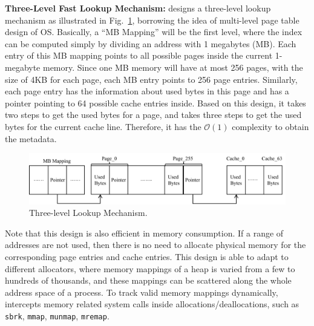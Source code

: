 
\textbf{Three-Level Fast Lookup Mechanism:} \MP{} designs a three-level lookup mechanism as illustrated in Fig.~\ref{fig:lookup}, borrowing the idea of multi-level page table design of OS. Basically, a ``MB Mapping'' will be the first level, where the index can be computed simply by dividing an address with 1 megabytes (MB). Each entry of this MB mapping points to all possible pages inside the current 1-megabyte memory. Since one MB memory will have at most 256 pages, with the size of 4KB for each page, each MB entry points to 256 page entries. Similarly, each page entry has the information about used bytes in this page and has a pointer pointing to 64 possible cache entries inside. Based on this design, it takes two steps to get the used bytes for a page, and takes three steps to get the used bytes for the current cache line. Therefore, it has the $\mathcal{O}(1)$ 
complexity to obtain the metadata.  
          
\begin{figure}[!h]
\centering
\includegraphics[width=5.5in]{figures/lookup}
\caption{Three-level Lookup Mechanism.\label{fig:lookup}}
\end{figure}

Note that this design is also efficient in memory consumption. If a range of addresses are not used, then there is no need to allocate physical memory for the corresponding page entries and cache entries. This design is able to adapt to different allocators, where memory mappings of a heap is varied from a few to hundreds of thousands, and these mappings can be scattered along the whole address space of a process. To track valid memory mappings dynamically, \MP{} intercepts memory related system calls inside allocations/deallocations, such as \texttt{sbrk}, \texttt{mmap}, \texttt{munmap}, \texttt{mremap}. 

